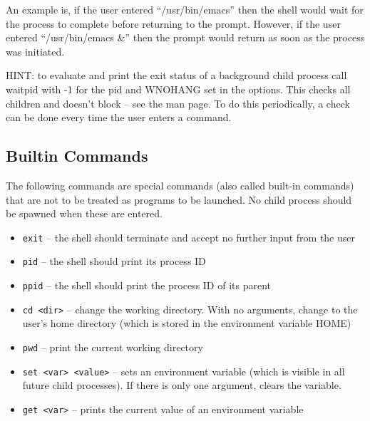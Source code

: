 \documentclass[letterpaper,10pt]{article}
\newcommand{\cmd}[1]{\texttt{#1}}
\begin{document}
\begin{enumerate}
       An example is, if the user entered ``/usr/bin/emacs” then the shell would wait for 
       the process to complete before returning to the prompt. However, if the user
       entered ``/usr/bin/emacs \&” then the prompt would return as soon as the process was initiated.

       HINT: to evaluate and print the exit status of a background child
       process call waitpid with -1 for the pid and WNOHANG set in the options. This
       checks all children and doesn’t block – see the man page. To do this periodically,
       a check can be done every time the user enters a command.
\end{enumerate}

\subsection{Builtin Commands} \label{cmds}
The following commands are special commands (also called built-in commands) that are not to be treated as programs to be launched.
No child process should be spawned when these are entered.

\begin{itemize}
 \item \cmd{exit} -- the shell should terminate and accept no further input from the user
 \item \cmd{pid} -- the shell should print its process ID
 \item \cmd{ppid} -- the shell should print the process ID of its parent
 \item \cmd{cd <dir>} -- change the working directory. With no arguments, change to the user's home directory
  (which is stored in the environment variable HOME)
 \item \cmd{pwd} -- print the current working directory
 \item \cmd{set <var> <value>} -- sets an environment variable (which is visible in all future child processes).
  If there is only one argument, clears the variable.
 \item \cmd{get <var>} -- prints the current value of an environment variable
\end{itemize}
\end{document}
